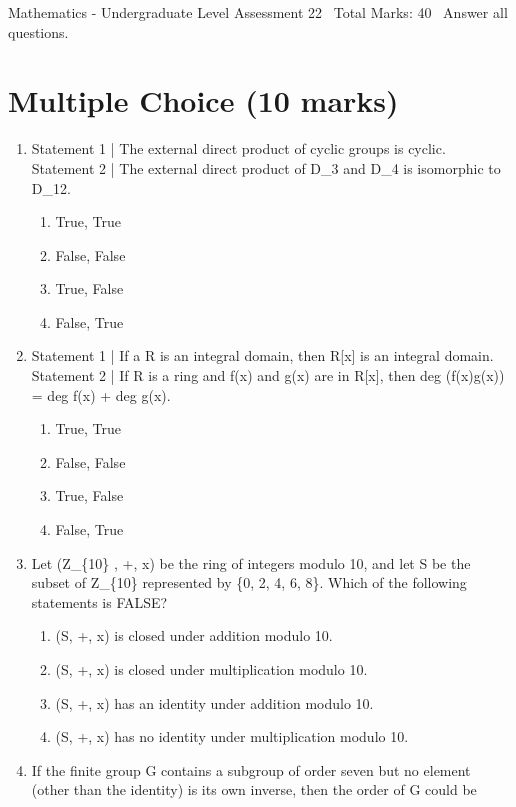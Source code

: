 \documentclass[12pt]{article}
\begin{document}
\begin{center}
Mathematics - Undergraduate Level Assessment 22 \
Total Marks: 40 \
Answer all questions.
\end{center}

\section*{Multiple Choice (10 marks)}
\begin{enumerate}[label=\arabic*.]
\item Statement 1 | The external direct product of cyclic groups is cyclic. Statement 2 | The external direct product of D\_3 and D\_4 is isomorphic to D\_12.
\begin{enumerate}[label=(\alph*)]
    \item True, True
    \item False, False
    \item True, False
    \item False, True
\end{enumerate}
\item Statement 1 | If a R is an integral domain, then R[x] is an integral domain. Statement 2 | If R is a ring and f(x) and g(x) are in R[x], then deg (f(x)g(x)) = deg f(x) + deg g(x).
\begin{enumerate}[label=(\alph*)]
    \item True, True
    \item False, False
    \item True, False
    \item False, True
\end{enumerate}
\item Let (Z\_\{10\} , +, x) be the ring of integers modulo 10, and let S be the subset of Z\_\{10\} represented by \{0, 2, 4, 6, 8\}. Which of the following statements is FALSE?
\begin{enumerate}[label=(\alph*)]
    \item (S, +, x) is closed under addition modulo 10.
    \item (S, +, x) is closed under multiplication modulo 10.
    \item (S, +, x) has an identity under addition modulo 10.
    \item (S, +, x) has no identity under multiplication modulo 10.
\end{enumerate}
\item If the finite group G contains a subgroup of order seven but no element (other than the identity) is its own inverse, then the order of G could be

\end{enumerate}
\end{document}
